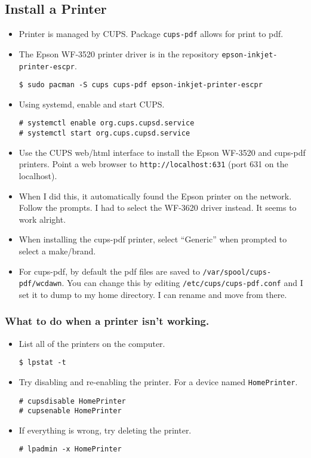 \documentclass{article}
\begin{document}
  \subsection{Install a Printer}

  \begin{itemize}
    \item Printer is managed by CUPS. Package \verb|cups-pdf| allows for print to pdf.
    \item The Epson WF-3520 printer driver is in the repository \verb|epson-inkjet-printer-escpr|.
\begin{verbatim}
$ sudo pacman -S cups cups-pdf epson-inkjet-printer-escpr
\end{verbatim}
    \item Using systemd, enable and start CUPS.
\begin{verbatim}
# systemctl enable org.cups.cupsd.service
# systemctl start org.cups.cupsd.service
\end{verbatim}
    \item Use the CUPS web/html interface to install the Epson WF-3520 and cups-pdf printers.
      Point a web browser to \verb|http://localhost:631| (port 631 on the localhost).
    \item When I did this, it automatically found the Epson printer on the network.
      Follow the prompts.
      I had to select the WF-3620 driver instead.
      It seems to work alright.
    \item When installing the cups-pdf printer, select ``Generic'' when prompted to select a make/brand.
    \item For cups-pdf, by default the pdf files are saved to \verb|/var/spool/cups-pdf/wcdawn|.
      You can change this by editing \verb|/etc/cups/cups-pdf.conf| and I set it to dump to my home directory.
      I can rename and move from there.
  \end{itemize}

    \subsubsection{What to do when a printer isn't working.}

    \begin{itemize}
      \item List all of the printers on the computer.
\begin{verbatim}
$ lpstat -t
\end{verbatim}
      \item Try disabling and re-enabling the printer.
        For a device named \verb|HomePrinter|.
\begin{verbatim}
# cupsdisable HomePrinter
# cupsenable HomePrinter
\end{verbatim}
      \item If everything is wrong, try deleting the printer.
\begin{verbatim}
# lpadmin -x HomePrinter
\end{verbatim}
    \end{itemize}
\end{document}
